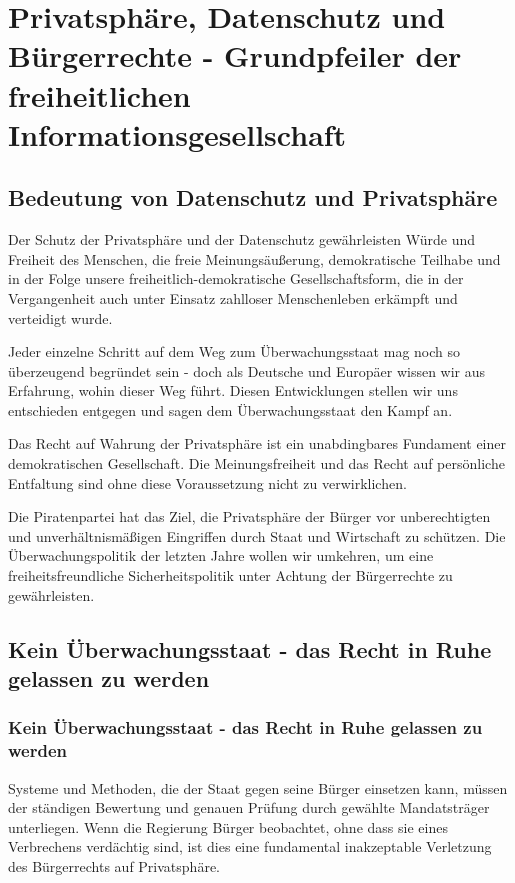 \section{Privatsphäre, Datenschutz und Bürgerrechte - Grundpfeiler der freiheitlichen Informationsgesellschaft}

\subsection*{Bedeutung von Datenschutz und Privatsphäre}
\label{datenschutz:bedeutung}
\abstimmung
Der Schutz der Privatsphäre und der Datenschutz gewährleisten Würde und Freiheit des Menschen, die freie Meinungsäußerung, demokratische Teilhabe und in der Folge unsere freiheitlich-demokratische Gesellschaftsform, die in der Vergangenheit auch unter Einsatz zahlloser Menschenleben erkämpft und verteidigt wurde.

Jeder einzelne Schritt auf dem Weg zum Überwachungsstaat mag noch so überzeugend begründet sein - doch als Deutsche und Europäer wissen wir aus Erfahrung, wohin dieser Weg führt. Diesen Entwicklungen stellen wir uns entschieden entgegen und sagen dem Überwachungsstaat den Kampf an.

Das Recht auf Wahrung der Privatsphäre ist ein unabdingbares Fundament einer demokratischen Gesellschaft. Die Meinungsfreiheit und das Recht auf persönliche Entfaltung sind ohne diese Voraussetzung nicht zu verwirklichen.

Die Piratenpartei hat das Ziel, die Privatsphäre der Bürger vor unberechtigten und unverhältnismäßigen Eingriffen durch Staat und Wirtschaft zu schützen. Die Überwachungspolitik der letzten Jahre wollen wir umkehren, um eine freiheitsfreundliche Sicherheitspolitik unter Achtung der Bürgerrechte zu gewährleisten.

\subsection*{Kein Überwachungsstaat - das Recht in Ruhe gelassen zu werden}
\label{datenschutz:datenschutz}
\subsubsection{Kein Überwachungsstaat - das Recht in Ruhe gelassen zu werden}
\abstimmung
Systeme und Methoden, die der Staat gegen seine Bürger einsetzen kann, müssen der ständigen Bewertung und genauen Prüfung durch gewählte Mandatsträger unterliegen. Wenn die Regierung Bürger beobachtet, ohne dass sie eines Verbrechens verdächtig sind, ist dies eine fundamental inakzeptable Verletzung des Bürgerrechts auf Privatsphäre.

